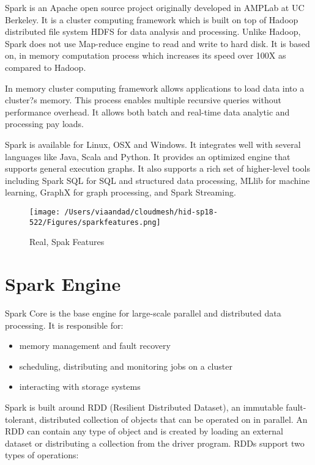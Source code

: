 \documentclass{paper}
\begin{document}
Spark is an Apache open source project originally developed in AMPLab at UC Berkeley. It is a cluster computing framework which is built on top of Hadoop distributed file system HDFS for data analysis and processing. Unlike Hadoop, Spark does not use Map-reduce engine to read and write to hard disk. It is based on, in memory computation process which increases its speed over 100X as compared to Hadoop.\hfill\break


In memory cluster computing framework allows applications to load data into a cluster?s memory. This process enables multiple recursive queries without performance overhead. It allows both batch and real-time data analytic and processing pay loads.\hfill\break


Spark is available for Linux, OSX and Windows. It integrates well with several languages like Java, Scala and Python. It provides an optimized engine that supports general execution graphs. It also supports a rich set of higher-level tools including Spark SQL for SQL and structured data processing, MLlib for machine learning, GraphX for graph processing, and Spark Streaming.\hfill\break


\begin{figure}[H]
	\centering
	\texttt{[image: /Users/viaandad/cloudmesh/hid-sp18-522/Figures/sparkfeatures.png]}
	\caption[Optional caption]{Real, Spak Features \cite{ref:feature}}
	\label{fig:sparkfeatures}
\end{figure}
\newpage
\section{Spark Engine}
Spark Core is the base engine for large-scale parallel and distributed data processing. It is responsible for: \hfill\break

\begin{itemize}
   \item  memory management and fault recovery
   \item  scheduling, distributing and monitoring jobs on a cluster
   \item  interacting with storage systems
\end{itemize}

Spark is built around  RDD (Resilient Distributed Dataset), an immutable fault-tolerant, distributed collection of objects that can be operated on in parallel. An RDD can contain any type of object and is created by loading an external dataset or distributing a collection from the driver program.
RDDs support two types of operations:\cite{ref:topal}\hfill\break
\end{document}
